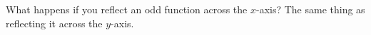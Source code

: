{What happens if you reflect an odd function across the $x$-axis? }
{The same thing as reflecting it across the $y$-axis.}